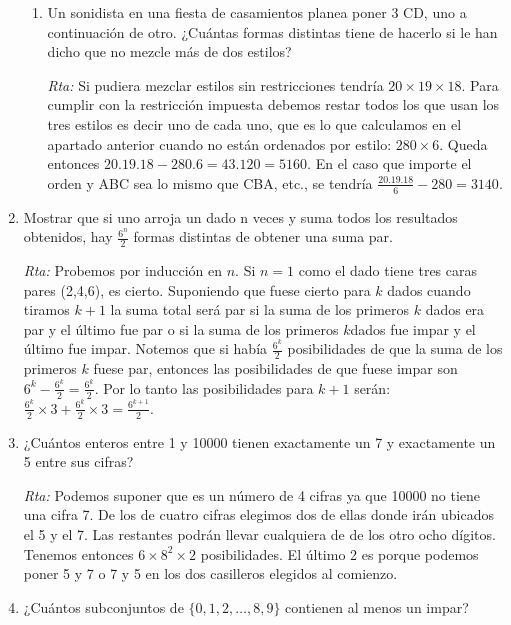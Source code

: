 \documentclass[12pt,spanish,makeidx]{amsbook}
\begin{document}
\begin{enumerate}
\begin{enumerate}
\item Un sonidista en una fiesta de casamientos planea poner 3 CD, uno a continuación
de otro. ¿Cuántas formas distintas tiene de hacerlo si le han dicho que no
mezcle más de dos estilos?

\noindent\textit{Rta:} Si pudiera mezclar estilos  sin restricciones tendría  $20\times 19\times 18$. Para cumplir con la restricción impuesta debemos restar todos los que usan los tres estilos es decir uno de cada uno, que es lo que calculamos en el  apartado anterior cuando no están ordenados por estilo: $280\times 6$. Queda entonces $20.19.18-280.6=43.120=5160$. En el caso que importe el orden y ABC sea lo mismo que CBA, etc., se tendría $\frac{20.19.18}{6}-280=3140$.
\end{enumerate}

\medskip

\item Mostrar que si uno arroja un dado n veces y suma todos los resultados obtenidos,
hay $\frac{6^n}{2}$
formas distintas de obtener una suma par.

\noindent\textit{Rta:} Probemos por inducción en $n$. Si $n=1$ como el dado tiene tres caras pares (2,4,6), es cierto.
Suponiendo que fuese cierto para $k$ dados cuando tiramos $k+1$ la suma total será par si la suma de los primeros $k$ dados era par y el último fue par o si la suma de los primeros $k$dados fue impar y el último fue impar. Notemos que si había $\frac{6^k}{2}$ posibilidades de que la suma de los primeros $k$ fuese par, entonces las posibilidades de que fuese impar son $6^k-\frac{6^k}{2}=\frac{6^k}{2}$. Por lo tanto las posibilidades para $k+1$ serán:${ \frac{6^k}{2}\times 3+\frac{6^k}{2}\times 3=\frac{6^{k+1}}{2}}$.

\medskip

\item ¿Cuántos enteros entre 1 y 10000 tienen exactamente un 7 y exactamente un 5
entre sus cifras?

\noindent\textit{Rta:} Podemos suponer que es un número de 4 cifras ya que 10000 no tiene una cifra 7.
De los de cuatro cifras elegimos dos de ellas donde irán ubicados el 5 y el 7. Las restantes podrán llevar cualquiera de de los otro ocho dígitos. Tenemos entonces $6\times 8^2\times 2$ posibilidades. El último 2 es porque podemos poner 5 y 7 o 7 y 5 en los dos casilleros elegidos al comienzo.

\medskip

\item ¿Cuántos subconjuntos de $\{0,1,2,\dots,8,9\}$ contienen al menos un impar?


\end{enumerate}
\end{document}
